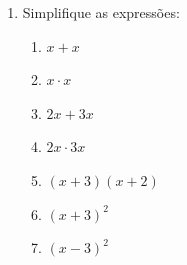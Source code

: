 \documentclass[a4paper,11pt]{article}
\begin{document}
\begin{enumerate}[label=\textbf{\arabic*.}, itemsep=1.2cm]
		\vspace{-1.3cm}
		
		\item Simplifique as expressões:
		
		\begin{multicols}{3}
				\begin{enumerate}[label=\alph*)]
				\item \(x + x\)
				\item \(x \cdot x\)
				\item \(2x + 3x\)
				\item \(2x \cdot 3x\)
				\item \((x + 3)(x + 2)\)
				\item \((x + 3)^2\)
				\item \((x - 3)^2\)
			\end{enumerate}
		\end{multicols}
	
		
	\end{enumerate}
	
\end{document}
